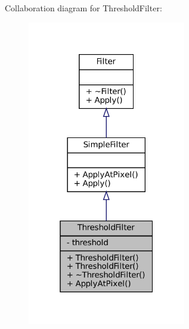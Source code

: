 Collaboration diagram for Threshold\+Filter\+:\nopagebreak
\begin{figure}[H]
\begin{center}
\leavevmode
\includegraphics[width=196pt]{classThresholdFilter__coll__graph}
\end{center}
\end{figure}
